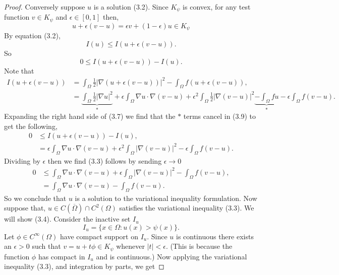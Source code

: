 \documentclass[12 pt]{report}
\newcommand{\abs}[1]{\left| #1 \right|}
\begin{document}
\begin{proof}
  Conversely suppose $u$ is a solution (3.2). Since $K_\psi$ is convex, for any test function $v \in K_\psi$ and $\epsilon \in [0, 1]$ then,
  \begin{equation}
      u + \epsilon(v - u) = \epsilon v + (1 - \epsilon)u \in K_\psi
  \end{equation} 
  By equation (3.2), 
  \begin{equation}
    I(u) \leq I(u + \epsilon (v - u)).
  \end{equation}
  So
  \begin{equation}
    0 \leq I(u + \epsilon (v - u)) - I(u).
  \end{equation}
  Note that 
  \begin{align}
    I(u + \epsilon(v - u)) &= \int_{\Omega} \frac{1}{2}\abs{\nabla (u + \epsilon(v - u))}^2 - \int_{\Omega}f(u + \epsilon(v - u)),\\
    &= \underbrace{\int_{\Omega} \frac{1}{2} \abs{\nabla u}^2}_{*} + \epsilon \int_\Omega \nabla u \cdot \nabla(v - u) + \epsilon^2 \int_\Omega \frac{1}{2} \abs{\nabla(v - u)}^2 \underbrace{-\int_\Omega fu}_{*} - \epsilon\int_\Omega f(v - u).
  \end{align}
  Expanding the right hand side of (3.7) we find that the $*$ terms cancel in (3.9) to get the following, 
  \begin{align*}
   0 &\leq  I(u + \epsilon (v - u)) - I(u),\\ 
   &=  \epsilon \int_\Omega \nabla u \cdot \nabla(v - u) + \epsilon^2 \int_\Omega \abs{\nabla(v - u)}^2 - \epsilon\int_\Omega f(v - u).
  \end{align*}
  Dividing by $\epsilon$ then we find (3.3) follows by sending $\epsilon \to 0$
  \begin{align*}
    0&\leq  \int_\Omega \nabla u \cdot \nabla(v - u) + \epsilon \int_\Omega \abs{\nabla(v - u)}^2 - \int_\Omega f(v - u),\\
   &= \int_\Omega \nabla u \cdot \nabla(v - u) - \int_\Omega f(v - u).
  \end{align*}
  So we conclude that $u$ is a solution to the variational inequality formulation. Now suppose that, $u \in C(\overline{\Omega}) \cap C^2(\Omega)$ satisfies the variational inequality (3.3). We will show (3.4). Consider the inactive set $I_u$
  \begin{equation}
    I_u = \{x \in \Omega : u(x) > \psi(x)\}.
  \end{equation}
  Let $\phi \in C^\infty(\Omega)$ have compact support on $I_u$. Since $u$ is continuous there exists an $\epsilon > 0$ such that $v = u + t\phi \in K_\psi$ whenever $\abs{t} < \epsilon$. (This is because the function $\phi$ has compact in $I_u$ and is continuous.) Now applying the variational inequality (3.3), and integration by parts, we get 

\end{proof}
\end{document}
